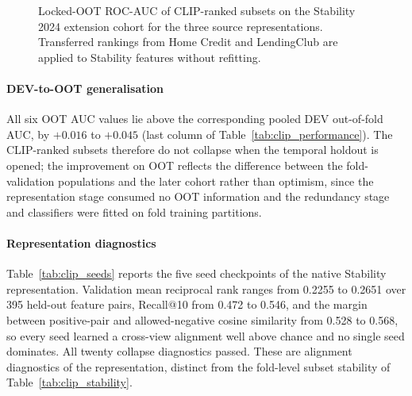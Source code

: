 \documentclass[preprint,12pt]{elsarticle}
\newcommand{\Kfeat}{K}
\begin{document}
\begin{figure}[htbp]
\centering
{}
\caption{Locked-OOT ROC-AUC of CLIP-ranked subsets on the Stability 2024 extension cohort for the three source representations. Transferred rankings from Home Credit and LendingClub are applied to Stability features without refitting.}
\label{fig:clip_performance}
\end{figure}

\paragraph{DEV-to-OOT generalisation}
All six OOT AUC values lie above the corresponding pooled DEV out-of-fold AUC, by $+0.016$ to $+0.045$ (last column of Table~\ref{tab:clip_performance}). The CLIP-ranked subsets therefore do not collapse when the temporal holdout is opened; the improvement on OOT reflects the difference between the fold-validation populations and the later cohort rather than optimism, since the representation stage consumed no OOT information and the redundancy stage and classifiers were fitted on fold training partitions.

\paragraph{Representation diagnostics}
Table~\ref{tab:clip_seeds} reports the five seed checkpoints of the native Stability representation. Validation mean reciprocal rank ranges from 0.2255 to 0.2651 over 395 held-out feature pairs, Recall@10 from 0.472 to 0.546, and the margin between positive-pair and allowed-negative cosine similarity from 0.528 to 0.568, so every seed learned a cross-view alignment well above chance and no single seed dominates. All twenty collapse diagnostics passed. These are alignment diagnostics of the representation, distinct from the fold-level subset stability of Table~\ref{tab:clip_stability}.
\end{document}
